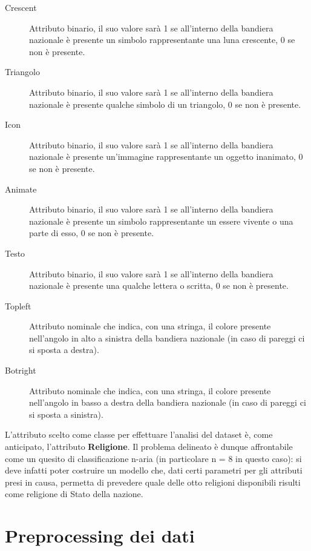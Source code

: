 \documentclass[a4paper,11pt,twoside,notitlepage,final]{scrartcl}
\begin{document}
\begin{description}
  \item[Crescent]
    Attributo binario, il suo valore sarà 1 se all'interno della bandiera nazionale è presente un simbolo rappresentante una luna crescente, 0 se non è presente.

  \item[Triangolo]
    Attributo binario, il suo valore sarà 1 se all'interno della bandiera nazionale è presente qualche simbolo di un triangolo, 0 se non è presente.

  \item[Icon]
    Attributo binario, il suo valore sarà 1 se all'interno della bandiera nazionale è presente un'immagine rappresentante un oggetto inanimato, 0 se non è presente.

  \item[Animate]
    Attributo binario, il suo valore sarà 1 se all'interno della bandiera nazionale è presente un simbolo rappresentante un essere vivente o una parte di esso, 0 se non è presente.

  \item[Testo]
    Attributo binario, il suo valore sarà 1 se all'interno della bandiera nazionale è presente una qualche lettera o scritta, 0 se non è presente.

  \item[Topleft]
    Attributo nominale che indica, con una stringa, il colore presente nell'angolo in alto a sinistra della bandiera nazionale (in caso di pareggi ci si sposta a destra).

  \item[Botright]
    Attributo nominale che indica, con una stringa, il colore presente nell'angolo in basso a destra della bandiera nazionale (in caso di pareggi ci si sposta a sinistra).
\end{description}

L'attributo scelto come classe per effettuare l'analisi del dataset è, come anticipato, l'attributo \textbf{Religione}.
Il problema delineato è dunque affrontabile come un quesito di classificazione n-aria (in particolare n = 8 in questo caso):
si deve infatti poter costruire un modello che, dati certi parametri per gli attributi presi in causa, permetta di prevedere quale delle otto religioni disponibili risulti come religione di Stato della nazione.


\section{Preprocessing dei dati}
\end{document}
